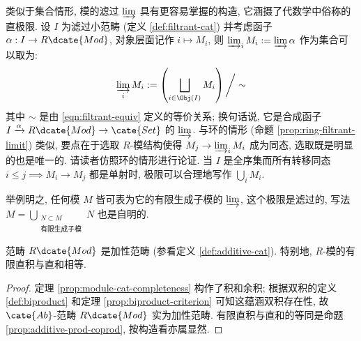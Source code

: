 \begin{remark}\label{rem:filtrant-mod-limit}
	类似于集合情形, 模的滤过 $\varinjlim$ 具有更容易掌握的构造, 它涵摄了代数学中俗称的直极限. 设 $I$ 为滤过小范畴 (定义 \ref{def:filtrant-cat}) 并考虑函子 $\alpha: I \to R\dcate{Mod}$, 对象层面记作 $i \mapsto M_i$, 则 $\varinjlim_i M_i := \varinjlim \alpha$ 作为集合可以取为:
	\[ \varinjlim_i M_i := \left( \bigsqcup_{i \in \Obj(I)} M_i \right) \bigg/\sim \]
	其中 $\sim$ 是由 \eqref{eqn:filtrant-equiv} 定义的等价关系; 换句话说, 它是合成函子 $I \xrightarrow{\alpha} R\dcate{Mod} \to \cate{Set}$ 的 $\varinjlim$. 与环的情形 (命题 \ref{prop:ring-filtrant-limit}) 类似, 要点在于选取 $R$-模结构使得 $M_j \to \varinjlim_i M_i$ 成为同态, 选取既是明显的也是唯一的. 请读者仿照环的情形进行论证. 当 $I$ 是全序集而所有转移同态 $i \leq j \implies M_i \to M_j$ 都是单射时, 极限可以合理地写作 $\bigcup_i M_i$.
\end{remark}

举例明之, 任何模 $M$ 皆可表为它的有限生成子模的 $\varinjlim$, 这个极限是滤过的, 写法 $M = \bigcup_{\substack{N \subset M \\ \text{有限生成子模}}} N$ 也是自明的.

\begin{corollary}\label{prop:Mod-cat-additive}
	范畴 $R\dcate{Mod}$ 是加性范畴 (参看定义 \ref{def:additive-cat}). 特别地, $R$-模的有限直积与直和相等.
\end{corollary}
\begin{proof}
	定理 \ref{prop:module-cat-completeness} 构作了积和余积; 根据双积的定义 \ref{def:biproduct} 和定理 \ref{prop:biproduct-criterion} 可知这蕴涵双积存在性, 故 $\cate{Ab}$-范畴 $R\dcate{Mod}$ 实为加性范畴. 有限直积与直和的等同是命题 \ref{prop:additive-prod-coprod}, 按构造看亦属显然.
\end{proof}

